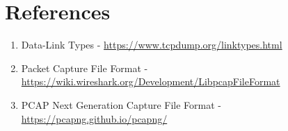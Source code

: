 \documentclass[12pt]{article}
\renewcommand\_{\textunderscore\allowbreak}
\begin{document}
\section{References}\label{sec:references}
    \begin{enumerate}
        \item Data-Link Types - \url{https://www.tcpdump.org/linktypes.html}\label{itm:linktypes}
        \item Packet Capture File Format - \url{https://wiki.wireshark.org/Development/LibpcapFileFormat}\label{itm:libpcap}
        \item PCAP Next Generation Capture File Format - \url{https://pcapng.github.io/pcapng/}\label{itm:pcapng}
    \end{enumerate}
\end{document}
